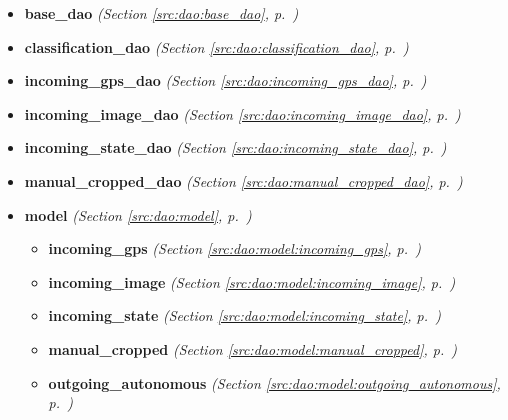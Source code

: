 \begin{itemize}
\setlength{\parskip}{0ex}
\item \textbf{base\_dao}
  \textit{(Section \ref{src:dao:base_dao}, p.~\pageref{src:dao:base_dao})}

\item \textbf{classification\_dao}
  \textit{(Section \ref{src:dao:classification_dao}, p.~\pageref{src:dao:classification_dao})}

\item \textbf{incoming\_gps\_dao}
  \textit{(Section \ref{src:dao:incoming_gps_dao}, p.~\pageref{src:dao:incoming_gps_dao})}

\item \textbf{incoming\_image\_dao}
  \textit{(Section \ref{src:dao:incoming_image_dao}, p.~\pageref{src:dao:incoming_image_dao})}

\item \textbf{incoming\_state\_dao}
  \textit{(Section \ref{src:dao:incoming_state_dao}, p.~\pageref{src:dao:incoming_state_dao})}

\item \textbf{manual\_cropped\_dao}
  \textit{(Section \ref{src:dao:manual_cropped_dao}, p.~\pageref{src:dao:manual_cropped_dao})}

\item \textbf{model}
  \textit{(Section \ref{src:dao:model}, p.~\pageref{src:dao:model})}

  \begin{itemize}
\setlength{\parskip}{0ex}
    \item \textbf{incoming\_gps}
  \textit{(Section \ref{src:dao:model:incoming_gps}, p.~\pageref{src:dao:model:incoming_gps})}

    \item \textbf{incoming\_image}
  \textit{(Section \ref{src:dao:model:incoming_image}, p.~\pageref{src:dao:model:incoming_image})}

    \item \textbf{incoming\_state}
  \textit{(Section \ref{src:dao:model:incoming_state}, p.~\pageref{src:dao:model:incoming_state})}

    \item \textbf{manual\_cropped}
  \textit{(Section \ref{src:dao:model:manual_cropped}, p.~\pageref{src:dao:model:manual_cropped})}

    \item \textbf{outgoing\_autonomous}
  \textit{(Section \ref{src:dao:model:outgoing_autonomous}, p.~\pageref{src:dao:model:outgoing_autonomous})}


\end{itemize}
\end{itemize}
